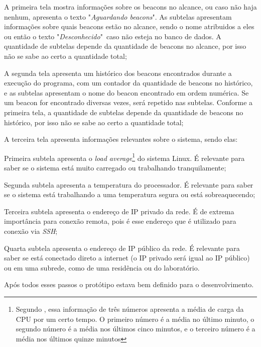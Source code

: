 \begin{alineas}
	\item A primeira tela mostra informações sobre os beacons no alcance, ou caso não haja nenhum, apresenta o texto "\textit{Aguardando beacons}". As subtelas apresentam informações sobre quais beacons estão no alcance, sendo o nome atribuidos a eles ou então o texto "\textit{Desconhecido}"\ caso não esteja no banco de dados. A quantidade de subtelas depende da quantidade de beacons no alcance, por isso não se sabe ao certo a quantidade total;
	\item A segunda tela apresenta um histórico dos beacons encontrados durante a execução do programa, com um contador da quantidade de beacons no histórico, e as subtelas apresentam o nome do beacon encontrado em ordem numérica. Se um beacon for encontrado diversas vezes, será repetido nas subtelas. Conforme a primeira tela, a quantidade de subtelas depende da quantidade de beacons no histórico, por isso não se sabe ao certo a quantidade total;
	\item A terceira tela apresenta informações relevantes sobre o sistema, sendo elas:
	\begin{subalineas}
		\item Primeira subtela apresenta o \textit{load average}\footnote{Segundo , essa informação de três números apresenta a média de carga da CPU por um certo tempo. O primeiro número é a média no último minuto, o segundo número é a média nos últimos cinco minutos, e o terceiro número é a média nos últimos quinze minutos} do sistema Linux. É relevante para saber se o sistema está muito carregado ou trabalhando tranquilamente;
		\item Segunda subtela apresenta a temperatura do processador. É relevante para saber se o sistema está trabalhando a uma temperatura segura ou está sobreaquecendo;
		\item Terceira subtela apresenta o endereço de IP privado da rede. É de extrema importância para conexão remota, pois é esse endereço que é utilizado para conexão via \textit{SSH};
		\item Quarta subtela apresenta o endereço de IP público da rede. É relevante para saber se está conectado direto a internet (o IP privado será igual ao IP público) ou em uma subrede, como de uma residência ou do laboratório.
	\end{subalineas}
\end{alineas}

Após todos esses passos o protótipo estava bem definido para o desenvolvimento.

